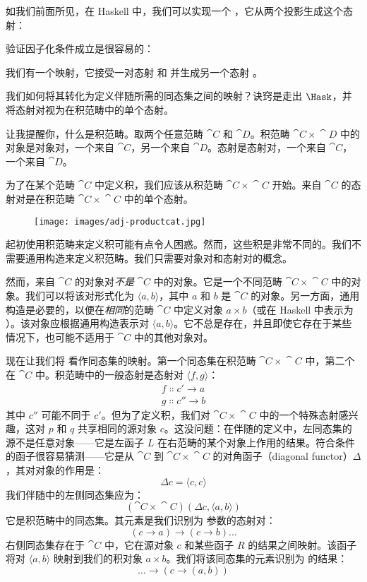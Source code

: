 如我们前面所见，在 Haskell 中，我们可以实现一个 ，它从两个投影生成这个态射：

验证因子化条件成立是很容易的：

我们有一个映射，它接受一对态射  和  并生成另一个态射 。

我们如何将其转化为定义伴随所需的同态集之间的映射？诀窍是走出 $\Hask$，并将态射对视为在积范畴中的单个态射。

让我提醒你，什么是积范畴。取两个任意范畴 $\cat{C}$ 和 $\cat{D}$。积范畴 $\cat{C}\times{}\cat{D}$ 中的对象是对象对，一个来自 $\cat{C}$，另一个来自 $\cat{D}$。态射是态射对，一个来自 $\cat{C}$，一个来自 $\cat{D}$。

为了在某个范畴 $\cat{C}$ 中定义积，我们应该从积范畴 $\cat{C}\times{}\cat{C}$ 开始。来自 $\cat{C}$ 的态射对是在积范畴 $\cat{C}\times{}\cat{C}$ 中的单个态射。

\begin{figure}[H]
  \centering
  \texttt{[image: images/adj-productcat.jpg]}
\end{figure}

\noindent
起初使用积范畴来定义积可能有点令人困惑。然而，这些积是非常不同的。我们不需要通用构造来定义积范畴。我们只需要对象对和态射对的概念。

然而，来自 $\cat{C}$ 的对象对\emph{不是} $\cat{C}$ 中的对象。它是一个不同范畴 $\cat{C}\times{}\cat{C}$ 中的对象。我们可以将该对形式化为 $\langle a, b \rangle$，其中 $a$ 和 $b$ 是 $\cat{C}$ 的对象。另一方面，通用构造是必要的，以便在\emph{相同}的范畴 $\cat{C}$ 中定义对象 $a\times{}b$（或在 Haskell 中表示为 ）。该对象应根据通用构造表示对 $\langle a, b \rangle$。它不总是存在，并且即使它存在于某些情况下，也可能不适用于 $\cat{C}$ 中的其他对象对。

现在让我们将  看作同态集的映射。第一个同态集在积范畴 $\cat{C}\times{}\cat{C}$ 中，第二个在 $\cat{C}$ 中。积范畴中的一般态射是态射对 $\langle f, g \rangle$：
\begin{gather*}
  f \Colon c' \to a \\
  g \Colon c'' \to b
\end{gather*}
其中 $c''$ 可能不同于 $c'$。但为了定义积，我们对 $\cat{C}\times{}\cat{C}$ 中的一个特殊态射感兴趣，这对 $p$ 和 $q$ 共享相同的源对象 $c$。这没问题：在伴随的定义中，左同态集的源不是任意对象——它是左函子 $L$ 在右范畴的某个对象上作用的结果。符合条件的函子很容易猜测——它是从 $\cat{C}$ 到 $\cat{C}\times{}\cat{C}$ 的对角函子（diagonal functor）$\Delta$，其对对象的作用是：
\[\Delta c = \langle c, c \rangle\]
我们伴随中的左侧同态集应为：
\[(\cat{C}\times{}\cat{C})(\Delta c, \langle a, b \rangle)\]
它是积范畴中的同态集。其元素是我们识别为  参数的态射对：
\[(c \to a) \to (c \to b) \ldots{}\]
右侧同态集存在于 $\cat{C}$ 中，它在源对象 $c$ 和某些函子 $R$ 的结果之间映射。该函子将对 $\langle a, b \rangle$ 映射到我们的积对象 $a\times{}b$。我们将该同态集的元素识别为  的结果：
\[\ldots{} \to (c \to (a, b))\]

